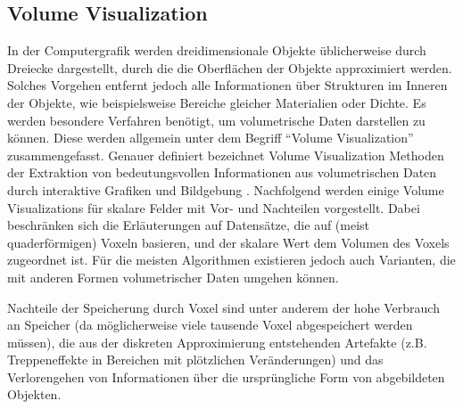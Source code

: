 \documentclass[a4paper,fontsize=12pt,toc=bib,halfparskip]{scrartcl}
\begin{document}
\subsection{Volume Visualization}
In der Computergrafik werden dreidimensionale Objekte \"ublicherweise durch Dreiecke dargestellt, durch die die Oberfl\"achen der Objekte approximiert werden. Solches Vorgehen entfernt jedoch alle Informationen \"uber Strukturen im Inneren der Objekte, wie beispielsweise Bereiche gleicher Materialien oder Dichte. Es werden besondere Verfahren ben\"otigt, um volumetrische Daten darstellen zu k\"onnen. Diese werden allgemein unter dem Begriff ``Volume Visualization'' zusammengefasst. Genauer definiert bezeichnet Volume Visualization Methoden der Extraktion von bedeutungsvollen Informationen aus volumetrischen Daten durch interaktive Grafiken und Bildgebung \cite[S.~127]{kaufman2005overview}. Nachfolgend werden einige Volume Visualizations f\"ur skalare Felder  mit Vor- und Nachteilen vorgestellt. Dabei beschr\"anken sich die Erl\"auterungen auf Datens\"atze, die auf (meist quaderf\"ormigen) Voxeln basieren, und der skalare Wert dem Volumen des Voxels zugeordnet ist. F\"ur die meisten Algorithmen existieren jedoch auch Varianten, die mit anderen Formen volumetrischer Daten umgehen k\"onnen.

Nachteile der Speicherung durch Voxel sind unter anderem der hohe Verbrauch an Speicher (da m\"oglicherweise viele tausende Voxel abgespeichert werden m\"ussen), die aus der diskreten Approximierung entstehenden Artefakte (z.B. Treppeneffekte in Bereichen mit pl\"otzlichen Ver\"anderungen) und das Verlorengehen von Informationen \"uber die urspr\"ungliche Form von abgebildeten Objekten.
\end{document}

